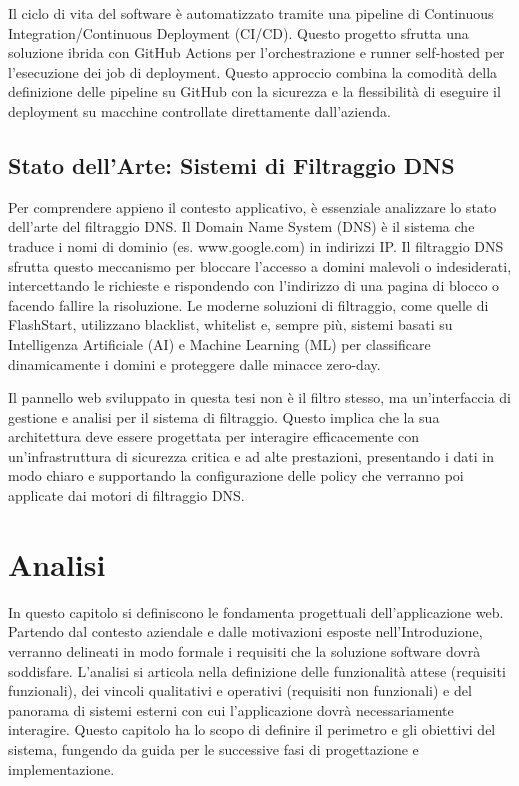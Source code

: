 \documentclass[12pt,a4paper,openright,twoside]{book}
\begin{document}
Il ciclo di vita del software è automatizzato tramite una pipeline di Continuous Integration/Continuous Deployment (CI/CD). Questo progetto sfrutta una soluzione ibrida con GitHub Actions per l'orchestrazione e runner self-hosted per l'esecuzione dei job di deployment. Questo approccio combina la comodità della definizione delle pipeline su GitHub con la sicurezza e la flessibilità di eseguire il deployment su macchine controllate direttamente dall'azienda.

\section{Stato dell'Arte: Sistemi di Filtraggio DNS}
\label{sec:dns_filtering}

Per comprendere appieno il contesto applicativo, è essenziale analizzare lo stato dell'arte del filtraggio DNS. Il Domain Name System (DNS) è il sistema che traduce i nomi di dominio (es. www.google.com) in indirizzi IP. Il filtraggio DNS sfrutta questo meccanismo per bloccare l'accesso a domini malevoli o indesiderati, intercettando le richieste e rispondendo con l'indirizzo di una pagina di blocco o facendo fallire la risoluzione. Le moderne soluzioni di filtraggio, come quelle di FlashStart, utilizzano blacklist, whitelist e, sempre più, sistemi basati su Intelligenza Artificiale (AI) e Machine Learning (ML) per classificare dinamicamente i domini e proteggere dalle minacce zero-day.

Il pannello web sviluppato in questa tesi non è il filtro stesso, ma un'interfaccia di gestione e analisi per il sistema di filtraggio. Questo implica che la sua architettura deve essere progettata per interagire efficacemente con un'infrastruttura di sicurezza critica e ad alte prestazioni, presentando i dati in modo chiaro e supportando la configurazione delle policy che verranno poi applicate dai motori di filtraggio DNS.
\chapter{Analisi}
\label{chap:analisi}

In questo capitolo si definiscono le fondamenta progettuali dell'applicazione web. Partendo dal contesto aziendale e dalle motivazioni esposte nell'Introduzione, verranno delineati in modo formale i requisiti che la soluzione software dovrà soddisfare. L'analisi si articola nella definizione delle funzionalità attese (requisiti funzionali), dei vincoli qualitativi e operativi (requisiti non funzionali) e del panorama di sistemi esterni con cui l'applicazione dovrà necessariamente interagire. Questo capitolo ha lo scopo di definire il perimetro e gli obiettivi del sistema, fungendo da guida per le successive fasi di progettazione e implementazione.
\end{document}

